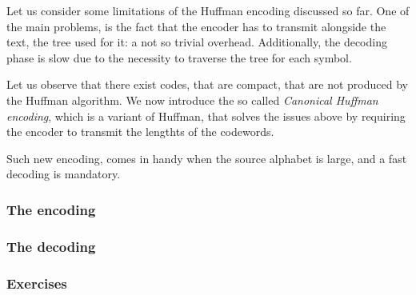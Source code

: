 \documentclass{subfiles}
\begin{document}
    Let us consider some limitations of the Huffman encoding discussed so far.
    One of the main problems, 
        is the fact that the encoder has to transmit alongside the text,
        the tree used for it: a not so trivial overhead.
    Additionally, 
        the decoding phase is slow due to the necessity to traverse the tree for each symbol.

    Let us observe that there exist codes, that are compact,
        that are not produced by the Huffman algorithm.
        We now introduce the so called \emph{Canonical Huffman encoding},
        which is a variant of Huffman, 
        that solves the issues above by requiring the encoder to transmit the lengthts of the codewords.

    Such new encoding, comes in handy when the source alphabet is large, 
        and a fast decoding is mandatory.

    \subsubsection{The encoding}
    

    \subsubsection{The decoding}
    

    \subsubsection{Exercises}
    
\end{document}
